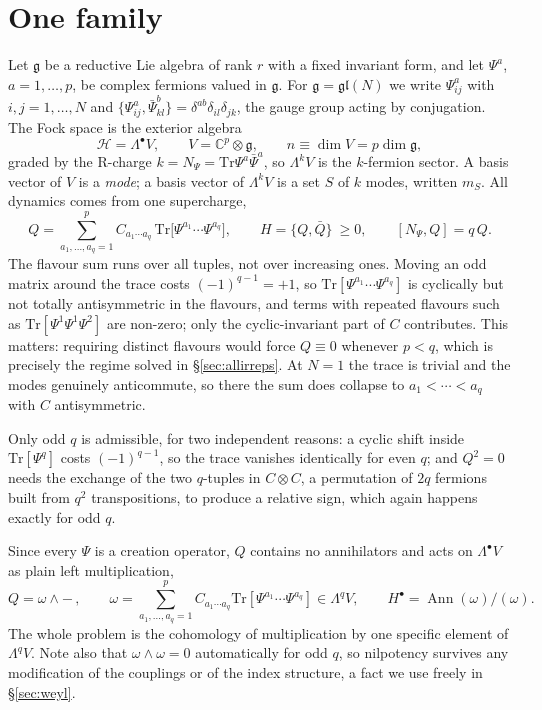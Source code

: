 \documentclass[10pt]{article}
\newcommand{\Tr}{\mathrm{Tr}}
\newcommand{\gl}{\mathfrak{gl}}
\newcommand{\g}{\mathfrak{g}}
\begin{document}
\section{One family}\label{sec:family}

Let $\g$ be a reductive Lie algebra of rank $r$ with a fixed invariant form, and let $\Psi^a$, $a=1,\dots,p$, be
complex fermions valued in $\g$. For $\g=\gl(N)$ we write $\Psi^a_{ij}$ with $i,j=1,\dots,N$ and
$\{\Psi^a_{ij},\bar\Psi^b_{kl}\}=\delta^{ab}\delta_{il}\delta_{jk}$, the gauge group acting by conjugation. The
Fock space is the exterior algebra
\begin{equation}
\mathcal H=\Lambda^\bullet V,\qquad V=\mathbb C^p\otimes\g,\qquad n\equiv\dim V=p\dim\g ,
\end{equation}
graded by the R-charge $k=N_\Psi=\Tr\Psi^a\bar\Psi^a$, so $\Lambda^kV$ is the $k$-fermion sector. A basis vector
of $V$ is a \emph{mode}; a basis vector of $\Lambda^kV$ is a set $S$ of $k$ modes, written $m_S$. All dynamics
comes from one supercharge,
\begin{equation}
Q=\sum_{a_1,\dots,a_q=1}^{p}C_{a_1\cdots a_q}\,\Tr\!\big[\Psi^{a_1}\cdots\Psi^{a_q}\big],\qquad
H=\{Q,\bar Q\}\ \ge0,\qquad [N_\Psi,Q]=q\,Q .
\label{eq:Q}
\end{equation}
The flavour sum runs over all tuples, not over increasing ones. Moving an odd matrix around the trace costs
$(-1)^{q-1}=+1$, so $\Tr[\Psi^{a_1}\cdots\Psi^{a_q}]$ is cyclically but not totally antisymmetric in the
flavours, and terms with repeated flavours such as $\Tr[\Psi^1\Psi^1\Psi^2]$ are non-zero; only the
cyclic-invariant part of $C$ contributes. This matters: requiring distinct flavours would force $Q\equiv0$
whenever $p<q$, which is precisely the regime solved in \S\ref{sec:allirreps}. At $N=1$ the trace is trivial and
the modes genuinely anticommute, so there the sum does collapse to $a_1<\cdots<a_q$ with $C$ antisymmetric.

Only odd $q$ is admissible, for two independent reasons: a cyclic shift inside $\Tr[\Psi^q]$ costs $(-1)^{q-1}$,
so the trace vanishes identically for even $q$; and $Q^2=0$ needs the exchange of the two $q$-tuples in
$C\otimes C$, a permutation of $2q$ fermions built from $q^2$ transpositions, to produce a relative sign, which
again happens exactly for odd $q$.

Since every $\Psi$ is a creation operator, $Q$ contains no annihilators and acts on $\Lambda^\bullet V$ as plain
left multiplication,
\begin{equation}
Q=\omega\wedge-\,,\qquad \omega=\sum_{a_1,\dots,a_q=1}^{p}C_{a_1\cdots a_q}\Tr[\Psi^{a_1}\cdots\Psi^{a_q}]\in\Lambda^qV ,
\qquad H^\bullet=\operatorname{Ann}(\omega)/(\omega).
\label{eq:wedge}
\end{equation}
The whole problem is the cohomology of multiplication by one specific element of $\Lambda^qV$. Note also that
$\omega\wedge\omega=0$ automatically for odd $q$, so nilpotency survives any modification of the couplings or of
the index structure, a fact we use freely in \S\ref{sec:weyl}.
\end{document}
